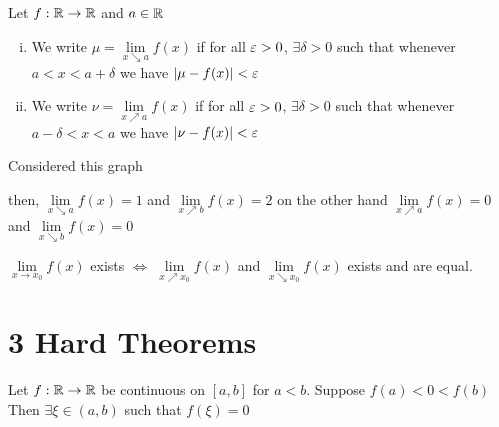 \begin{definition*}[32]\label{def:lfcts}
    Let $f: \mathbb R \rightarrow \mathbb R$ and $a \in \mathbb R$
    \begin{enumerate}[(i)]
        \item We write $\mu = \lim\limits_{x \searrow a} f(x)$ if for all $\varepsilon > 0$, $\exists\delta > 0$ such that
        whenever $a < x < a + \delta$ we have $|\mu - f(x)| < \varepsilon$
        \item We write $\nu = \lim\limits_{x \nearrow a} f(x)$ if for all $\varepsilon > 0$, $\exists\delta > 0$ such that
        whenever $a  - \delta< x < a$ we have $|\nu - f(x)| < \varepsilon$
    \end{enumerate}
\end{definition*}
\begin{example*}
    Considered this graph 
    \begin{center}
    \end{center}
    then, $\lim\limits_{x \searrow a} f(x) = 1$ and $\lim\limits_{x \nearrow b} f(x) = 2$
    on the other hand $\lim\limits_{x \nearrow a} f(x) = 0$ and $\lim\limits_{x \searrow b} f(x) = 0$
\end{example*}
\begin{example*}
    $\lim\limits_{x \to x_0} f(x)$ exists $\iff$ $\lim\limits_{x \nearrow x_0} f(x)$ and $\lim\limits_{x \searrow x_0} f(x)$ exists and are equal.
\end{example*}
    

\section{3 Hard Theorems}

\begin{theorem}\label{thm:ivalt}
    Let $f: \mathbb R \rightarrow \mathbb R$ be continuous on $\left[a, b\right]$ for $a < b$.
    Suppose $f(a) < 0 < f(b)$
    Then $\exists \xi \in (a, b)$ such that $f(\xi)=0$
\end{theorem}


